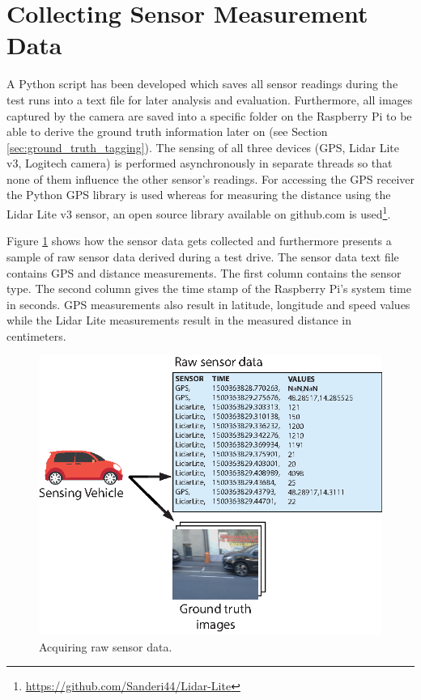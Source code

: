 \section{Collecting Sensor Measurement Data}
\label{sec:sensor_measurement_collection}

A Python script has been developed which saves all sensor readings during the test runs into a text file for later analysis and evaluation. Furthermore, all images captured by the camera are saved into a specific folder on the Raspberry Pi to be able to derive the ground truth information later on (see Section \ref{sec:ground_truth_tagging}).
The sensing of all three devices (GPS, Lidar Lite v3, Logitech camera) is performed asynchronously in separate threads so that none of them influence the other sensor's readings. For accessing the GPS receiver the Python GPS library is used whereas for measuring the distance using the Lidar Lite v3 sensor, an open source library available on github.com is used\footnote{\url{https://github.com/Sanderi44/Lidar-Lite}}. 

Figure \ref{fig:sample_sensor_trace} shows how the sensor data gets collected and furthermore presents a sample of raw sensor data derived during a test drive. The sensor data text file contains GPS and distance measurements. The first column contains the sensor type. The second column gives the time stamp of the Raspberry Pi's system time in seconds. GPS measurements also result in latitude, longitude and speed values while the Lidar Lite measurements result in the measured distance in centimeters.

\begin{figure}
	\centering
	\includegraphics{img/obtaining-raw-dataset.eps}
	\caption{Acquiring raw sensor data.}
	\label{fig:sample_sensor_trace}
\end{figure}



